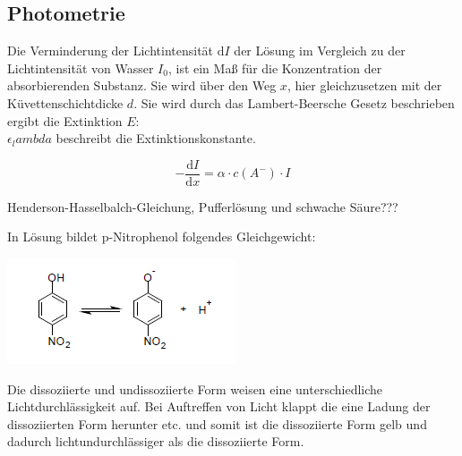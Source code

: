 \documentclass[12pt,a4paper,titlepage,headinclude,bibtotoc]{scrartcl}
\begin{document}
\subsection{Photometrie}
Die Verminderung der Lichtintensität $\mathrm{d}I$ der Lösung im Vergleich zu der Lichtintensität von Wasser $I_0$, ist ein Maß für die Konzentration der absorbierenden Substanz. Sie wird über den Weg $x$, hier gleichzusetzen mit der Küvettenschichtdicke $d$. Sie wird durch das Lambert-Beersche Gesetz beschrieben ergibt die Extinktion $E$:\\


$\epsilon_lambda$ beschreibt die Extinktionskonstante. 








\begin{equation}
-\frac{\mathrm{d}I}{\mathrm{d}x} = \alpha \cdot c(A^-) \cdot I
\end{equation}








Henderson-Hasselbalch-Gleichung, Pufferlösung und schwache Säure???








In Lösung bildet p-Nitrophenol folgendes Gleichgewicht:










\begin{center}

\includegraphics[scale=1]{Strukturformel}

\end{center}
Die dissoziierte und undissoziierte Form weisen eine unterschiedliche Lichtdurchlässigkeit auf.
Bei Auftreffen von Licht klappt die eine Ladung der dissoziierten Form herunter etc. und somit ist die dissoziierte Form gelb und dadurch lichtundurchlässiger als die dissoziierte Form.
\end{document}
